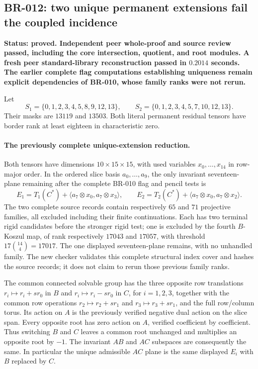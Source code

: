 \subsection*{BR-012: two unique permanent extensions fail the coupled incidence}
\textbf{Status: proved.  Independent peer whole-proof and source review
passed, including the core intersection, quotient, and root modules.
A fresh peer standard-library reconstruction passed in $0.2014$ seconds.
The earlier complete flag computations establishing uniqueness remain
explicit dependencies of BR-010, whose family ranks were not rerun.}

Let
\[
 S_1=\{0,1,2,3,4,5,8,9,12,13\},\qquad
 S_2=\{0,1,2,3,4,5,7,10,12,13\}.
\]
Their masks are $13119$ and $13503$.  Both literal permanent residual
tensors have border rank at least eighteen in characteristic zero.

\paragraph{The previously complete unique-extension reduction.}
Both tensors have dimensions $10\times15\times15$, with used variables
$x_0,\ldots,x_{14}$ in row-major order.  In the ordered slice basis
$a_0,\ldots,a_9$, the only invariant seventeen-plane remaining after
the complete BR-010 flag and pencil tests is
\[
 E_1=T_1(C^*)+\langle a_7\otimes x_0,a_7\otimes x_3\rangle,
 \qquad
 E_2=T_2(C^*)+\langle a_7\otimes x_0,a_7\otimes x_2\rangle.
\]
The two complete source records contain respectively $65$ and $71$
projective families, all excluded including their finite continuations.
Each has two terminal rigid candidates before the stronger rigid test;
one is excluded by the fourth $B$-Koszul map, of rank respectively
$17043$ and $17057$, with threshold $17\binom{14}{4}=17017$.
The one displayed seventeen-plane remains, with no unhandled family.
The new checker validates this complete structural index cover and hashes
the source records; it does not claim to rerun those previous family ranks.

The common connected solvable group has the three opposite row
translations $r_i\mapsto r_i+s r_0$ in $B$ and
$r_i\mapsto r_i-s r_0$ in $C$, for $i=1,2,3$, together with the common
row operations $r_2\mapsto r_2+s r_1$ and
$r_3\mapsto r_3+s r_1$, and the full row/column torus.  Its action
on $A$ is the previously verified negative dual action on the slice span.
Every opposite root has zero action on $A$, verified coefficient by
coefficient.  Thus switching $B$ and $C$ leaves a common root unchanged
and multiplies an opposite root by $-1$.  The invariant $AB$ and $AC$
subspaces are consequently the same.  In particular the unique admissible
$AC$ plane is the same displayed $E_i$ with $B$ replaced by $C$.

